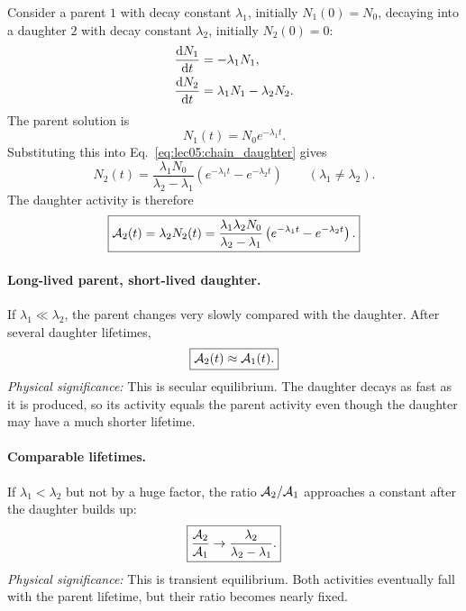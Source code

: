 Consider a parent \(1\) with decay constant \(\lambda_1\), initially
\(N_1(0)=N_0\), decaying into a daughter \(2\) with decay constant
\(\lambda_2\), initially \(N_2(0)=0\):
\begin{align}
  \label{eq:lec05:chain_parent}
  \dv{N_1}{t} &= -\lambda_1 N_1,\\
  \label{eq:lec05:chain_daughter}
  \dv{N_2}{t} &= \lambda_1N_1-\lambda_2N_2.
\end{align}
The parent solution is
\begin{equation}
  \label{eq:lec05:chain_parent_solution}
  \boxed{N_1(t)=N_0e^{-\lambda_1t}.}
\end{equation}
Substituting this into Eq.~\eqref{eq:lec05:chain_daughter} gives
\begin{equation}
  \label{eq:lec05:chain_daughter_solution}
  \boxed{N_2(t)=\frac{\lambda_1N_0}{\lambda_2-\lambda_1}
  \left(e^{-\lambda_1t}-e^{-\lambda_2t}\right)}
  \qquad(\lambda_1\neq\lambda_2).
\end{equation}
The daughter activity is therefore
\begin{equation}
  \label{eq:lec05:chain_daughter_activity}
  \boxed{\mathcal{A}_2(t)=\lambda_2N_2(t)
  =\frac{\lambda_1\lambda_2N_0}{\lambda_2-\lambda_1}
  \left(e^{-\lambda_1t}-e^{-\lambda_2t}\right).}
\end{equation}

\paragraph{Long-lived parent, short-lived daughter.}
If \(\lambda_1\ll\lambda_2\), the parent changes very slowly compared with the
daughter.  After several daughter lifetimes,
\begin{equation}
  \label{eq:lec05:secular_equilibrium}
  \boxed{\mathcal{A}_2(t)\approx\mathcal{A}_1(t).}
\end{equation}
\textit{Physical significance:} This is secular equilibrium.  The daughter
decays as fast as it is produced, so its activity equals the parent activity
even though the daughter may have a much shorter lifetime.

\paragraph{Comparable lifetimes.}
If \(\lambda_1<\lambda_2\) but not by a huge factor, the ratio
\(\mathcal{A}_2/\mathcal{A}_1\) approaches a constant after the daughter builds up:
\begin{equation}
  \label{eq:lec05:transient_equilibrium}
  \boxed{\frac{\mathcal{A}_2}{\mathcal{A}_1}\rightarrow
  \frac{\lambda_2}{\lambda_2-\lambda_1}.}
\end{equation}
\textit{Physical significance:} This is transient equilibrium.  Both activities
eventually fall with the parent lifetime, but their ratio becomes nearly fixed.

